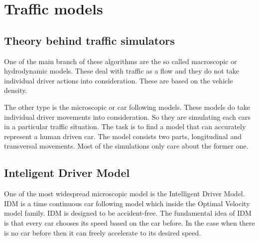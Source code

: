 \documentclass[a4paper,12pt,twoside]{report}
\begin{document}
	\chapter{Traffic models}
		\section{Theory behind traffic simulators}
			One of the main branch of these algorithms are the so called macroscopic or hydrodynamic models. These deal with traffic as a flow and they do not take individual driver actions into consideration. These are based on the vehicle density.

			The other type is the microscopic or car following models. These models do take individual driver movements into consideration. So they are simulating each cars in a particular traffic situation. The task is to find a model that can accurately represent a human driven car. The model consists two parts, longitudinal and transversal movements. Most of the simulations only care about the former one.
		\section{Inteligent Driver Model}
			One of the most widespread microscopic model is the Intelligent Driver Model. IDM is a time continuous car following model which inside the Optimal Velocity model family. IDM is designed to be accident-free. The fundamental idea of IDM is that every car chooses its speed based on the car before. In the case when there is no car before then it can freely accelerate to its desired speed.
\end{document}
